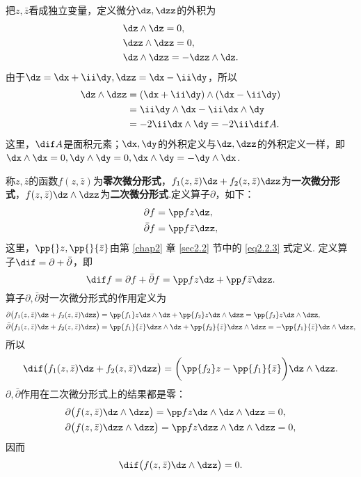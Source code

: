把$z,\bar z$看成独立变量，定义微分$\dz,\dzz$的外积为
\begin{align*}
&\dz\wedge \dz=0,\\
&\dzz\wedge \dzz=0,\\
&\dz\wedge \dzz=-\dzz\wedge \dz.
\end{align*}
由于$\dz=\dx+\ii\dy,\dzz=\dx-\ii\dy$，所以
\begin{align*}
\dz\wedge\dzz&=(\dx+\ii\dy)\wedge(\dx-\ii\dy)\\
&=\ii\dy\wedge\dx-\ii\dx\wedge\dy\\
&=-2\ii\dx\wedge\dy=-2\ii\dif A.
\end{align*}
这里，$\dif A$是面积元素；$\dx,\dy$的外积定义与$\dz,\dzz$的外积定义一样，即$\dx\wedge\dx=0,\dy\wedge\dy=0,\dx\wedge\dy=-\dy\wedge\dx$.

称$z,\bar z$的函数$f(z,\bar z)$为\textbf{零次微分形式}，$f_1(z,\bar z)\dz+f_2(z,\bar z)\dzz$为\textbf{一次微分形式}，$f(z,\bar z)\dz\wedge\dzz$为\textbf{二次微分形式}.定义算子$\partial$，如下：
\begin{align*}
&\partial f=\pp fz\dz,\\
&\bar \partial f=\pp f{\bar z}\dzz,
\end{align*}
这里，$\pp{}z,\pp{}{\bar z}$由第 \ref{chap2} 章 \ref{sec2.2} 节中的 \eqref{eq2.2.3} 式定义. 定义算子$\dif =\partial+\bar\partial$，即
\begin{equation}\label{eq3.6.1}
\dif f=\partial f+\bar\partial f=\pp fz\dz+\pp f{\bar z}\dzz.
\end{equation}
算子$\partial,\bar\partial$对一次微分形式的作用定义为
\begin{align*}
\partial\big(f_1(z,\bar z)\dz+f_2(z,\bar z)\dzz\big)
&=\pp{f_1}z\dz\wedge\dz+\pp{f_2}z\dz\wedge\dzz=\pp{f_2}z\dz\wedge\dzz,\\
\bar\partial\big(f_1(z,\bar z)\dz+f_2(z,\bar z)\dzz\big)
&=\pp{f_1}{\bar z}\dzz\wedge\dz+\pp{f_2}{\bar z}\dzz\wedge\dzz=-\pp{f_1}{\bar z}\dz\wedge\dzz,
\end{align*}
所以
\begin{equation}\label{eq3.6.2}
  \dif \big(f_1(z,\bar z)\dz+f_2(z,\bar z)\dzz\big)
  =\bigg(\pp{f_2}z-\pp{f_1}{\bar z}\bigg)\dz\wedge\dzz.
\end{equation}
$\partial,\bar\partial$作用在二次微分形式上的结果都是零：
\begin{align*}
&\partial\big(f(z,\bar z)\dz\wedge\dzz\big)=\pp fz\dz\wedge\dz\wedge\dzz=0,\\
&\partial\big(f(z,\bar z)\dzz\wedge\dzz\big)=\pp fz\dzz\wedge\dz\wedge\dzz=0,
\end{align*}
因而
\begin{equation}\label{eq3.6.3}
\dif \big(f(z,\bar z)\dz\wedge\dzz\big)=0.
\end{equation}


